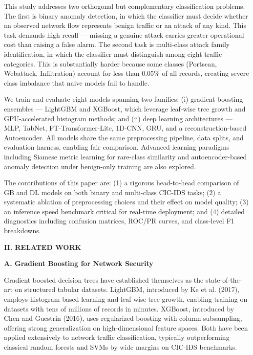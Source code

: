 \documentclass[
  journal,
  10pt]{IEEEtran}
\begin{document}
This study addresses two orthogonal but complementary classification
problems. The first is binary anomaly detection, in which the classifier
must decide whether an observed network flow represents benign traffic
or an attack of any kind. This task demands high recall --- missing a
genuine attack carries greater operational cost than raising a false
alarm. The second task is multi-class attack family identification, in
which the classifier must distinguish among eight traffic categories.
This is substantially harder because some classes (Portscan, Webattack,
Infiltration) account for less than 0.05\% of all records, creating
severe class imbalance that naive models fail to handle.

We train and evaluate eight models spanning two families: (i) gradient
boosting ensembles --- LightGBM and XGBoost, which leverage leaf-wise
tree growth and GPU-accelerated histogram methods; and (ii) deep
learning architectures --- MLP, TabNet, FT-Transformer-Lite, 1D-CNN,
GRU, and a reconstruction-based Autoencoder. All models share the same
preprocessing pipeline, data splits, and evaluation harness, enabling
fair comparison. Advanced learning paradigms including Siamese metric
learning for rare-class similarity and autoencoder-based anomaly
detection under benign-only training are also explored.

The contributions of this paper are: (1) a rigorous head-to-head
comparison of GB and DL models on both binary and multi-class CIC-IDS
tasks; (2) a systematic ablation of preprocessing choices and their
effect on model quality; (3) an inference speed benchmark critical for
real-time deployment; and (4) detailed diagnostics including confusion
matrices, ROC/PR curves, and class-level F1 breakdowns.

\textbf{II. RELATED WORK}

\textbf{A. Gradient Boosting for Network Security}

Gradient boosted decision trees have established themselves as the
state-of-the-art on structured tabular datasets. LightGBM, introduced by
Ke et al. (2017), employs histogram-based learning and leaf-wise tree
growth, enabling training on datasets with tens of millions of records
in minutes. XGBoost, introduced by Chen and Guestrin (2016), uses
regularized boosting with column subsampling, offering strong
generalization on high-dimensional feature spaces. Both have been
applied extensively to network traffic classification, typically
outperforming classical random forests and SVMs by wide margins on
CIC-IDS benchmarks.
\end{document}
